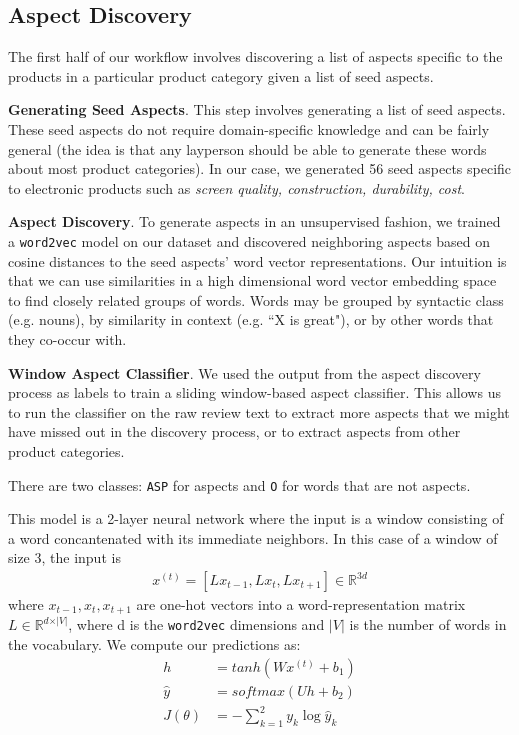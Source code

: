 \documentclass{article} %
\begin{document}
\subsection{Aspect Discovery}
The first half of our workflow involves discovering a list of aspects specific to the products in a particular product category given a list of seed aspects.

\textbf{Generating Seed Aspects}. This step involves generating a list of seed aspects. These seed aspects do not require domain-specific knowledge and can be fairly general (the idea is that any layperson should be able to generate these words about most product categories). In our case, we generated 56 seed aspects specific to electronic products such as \textit{screen quality, construction, durability, cost}. 

\textbf{Aspect Discovery}. To generate aspects in an unsupervised fashion, we trained a \texttt{word2vec} model on our dataset and discovered neighboring aspects based on cosine distances to the seed aspects' word vector representations. Our intuition is that we can use similarities in a high dimensional word vector embedding space to find closely related groups of words. Words may be grouped by syntactic class (e.g. nouns), by similarity in context (e.g. ``X is great"), or by other words that they co-occur with.

\textbf{Window Aspect Classifier}. We used the output from the aspect discovery process as labels to train a sliding window-based aspect classifier. This allows us to run the classifier on the raw review text to extract more aspects that we might have missed out in the discovery process, or to extract aspects from other product categories.

There are two classes: \texttt{ASP} for aspects and \texttt{O} for words that are not aspects.

This model is a 2-layer neural network where the input is a window consisting of a word concantenated with its immediate neighbors. In this case of a window of size 3, the input is
\begin{align}
x^{(t)} = [ L x_{t-1}, L x_t, L x_{t+1} ] \in \mathbb{R}^{3d}
\end{align}
where $x_{t-1}, x_t, x_{t+1}$ are one-hot vectors into a word-representation matrix $L \in \mathbb{R}^{d \times \vert V \vert}$, where d is the \texttt{word2vec} dimensions and $\vert V \vert$ is the number of words in the vocabulary. We compute our predictions as:
\begin{align}
h &= tanh(W x^{(t)} + b_1)\\
\hat{y} &= softmax (Uh + b_2)\\
J(\theta) &= -\sum_{k=1}^{2} y_k \log \hat{y}_k
\end{align}
\end{document}
